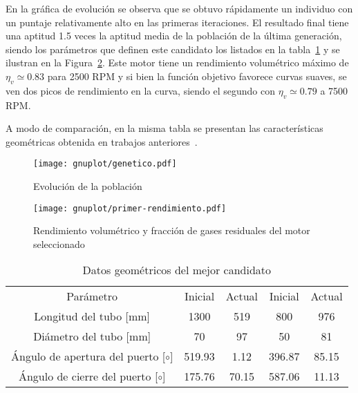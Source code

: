 %
%

En la gráfica de evolución se observa que se obtuvo rápidamente un individuo con
un puntaje relativamente alto en las primeras iteraciones.
%
El resultado final tiene una aptitud 1.5 veces la aptitud media de la población
de la última generación, siendo los parámetros que definen este candidato los
listados en la tabla~\ref{tab:resultado_primer_it} y se ilustran en la
Figura~\ref{fig:primer_op}.
%
Este motor tiene un rendimiento volumétrico máximo de $\eta_{v} \simeq 0.83$
para 2500 RPM y si bien la función objetivo favorece curvas suaves, se ven dos
picos de rendimiento en la curva, siendo el segundo con $\eta_{v} \simeq 0.79$ a
7500 RPM.

A modo de comparación, en la misma tabla se presentan las características
geométricas obtenida en trabajos anteriores~\parencite{mrcvc:sim_computacional}.

\begin{figure}[ht]
  \centering
  \texttt{[image: gnuplot/genetico.pdf]}
  \caption{Evolución de la población} \label{fig:ev_primer_op}
\end{figure}%
\begin{figure}[ht]
  \centering
  \texttt{[image: gnuplot/primer-rendimiento.pdf]}
  \caption{Rendimiento volumétrico y fracción de gases residuales del motor seleccionado} \label{fig:primer_op}
\end{figure}

\begin{table}
  \centering
  \begin{tabular}{ccccc} \toprule
    Parámetro & Inicial & Actual & Inicial & Actual \\
    Longitud del tubo [mm] & 1300 & 519 & 800 & 976 \\
    Diámetro del tubo [mm] & 70 & 97 & 50 & 81 \\
    Ángulo de apertura del puerto [$\circ$] & 519.93 & 1.12 & 396.87 & 85.15 \\
    Ángulo de cierre del puerto [$\circ$] & 175.76 & 70.15 & 587.06 & 11.13 \\ \bottomrule
  \end{tabular}
  \caption{Datos geométricos del mejor candidato}\label{tab:resultado_primer_it}
\end{table}


